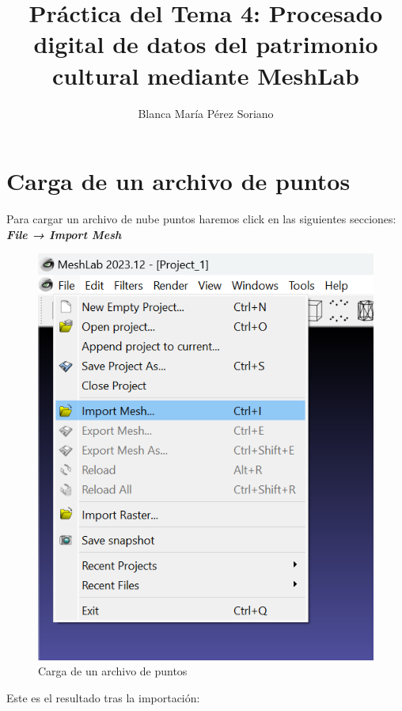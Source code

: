 \documentclass{article}
\title{Práctica del Tema 4: Procesado digital de datos del patrimonio cultural mediante MeshLab}
\author{Blanca María Pérez Soriano}
\begin{document}
\maketitle

\pagebreak

\tableofcontents

\pagebreak

\section{Carga de un archivo de puntos}

Para cargar un archivo de nube puntos haremos click en las siguientes secciones: \textbf{\textit{File → Import Mesh}}

\begin{figure}[H]
    \centering
    \includegraphics[scale=0.45]{images/importar_01.png}
    \caption{Carga de un archivo de puntos}
\end{figure}

Este es el resultado tras la importación:
\end{document}
